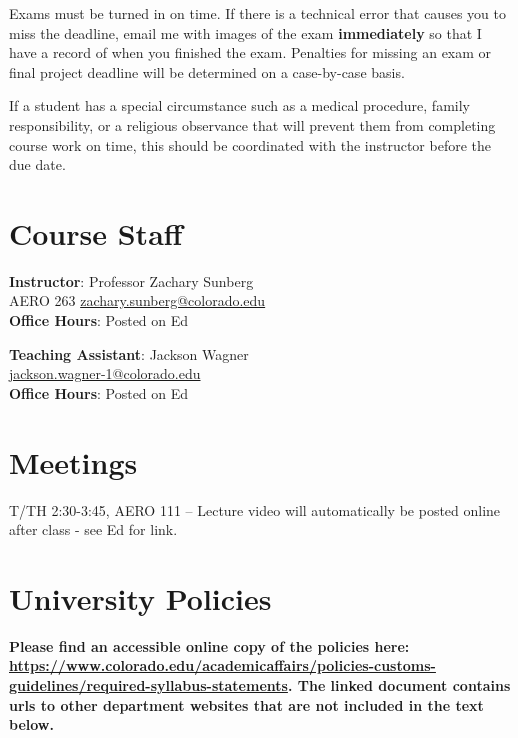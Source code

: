 \documentclass[9pt]{article}
\begin{document}
Exams must be turned in on time. If there is a technical error that causes you to miss the deadline, email me with images of the exam \textbf{immediately} so that I have a record of when you finished the exam. Penalties for missing an exam or final project deadline will be determined on a case-by-case basis.

If a student has a special circumstance such as a medical procedure, family responsibility, or a religious observance that will prevent them from completing course work on time, this should be coordinated with the instructor before the due date.

\section*{Course Staff}

\begin{multicols}{2}
    \begin{minipage}{\columnwidth}
        \textbf{Instructor}: Professor Zachary Sunberg\\
        AERO 263 \href{mailto://zachary.sunberg@colorado.edu}{zachary.sunberg@colorado.edu}\\
        \textbf{Office Hours}: Posted on Ed
    \end{minipage}

    \begin{minipage}{\columnwidth}
        \textbf{Teaching Assistant}: Jackson Wagner\\
        \href{mailto://jackson.wagner-1@colorado.edu}{jackson.wagner-1@colorado.edu}\\
        \textbf{Office Hours}: Posted on Ed
    \end{minipage}
\end{multicols}

\section*{Meetings}

T/TH 2:30-3:45, AERO 111 -- Lecture video will automatically be posted online after class - see Ed for link.

\section*{University Policies}

\textbf{Please find an accessible online copy of the policies here: \url{https://www.colorado.edu/academicaffairs/policies-customs-guidelines/required-syllabus-statements}. The linked document contains urls to other department websites that are not included in the text below.}
\end{document}
